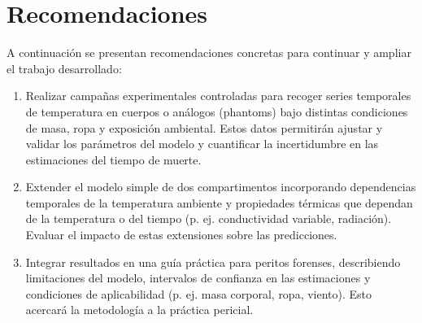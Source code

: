\documentclass[a4paper,10pt]{article}
\begin{document}
\section{Recomendaciones}\label{sec:rec}

	A continuación se presentan recomendaciones concretas para continuar y ampliar
	el trabajo desarrollado:

	\begin{enumerate}
		\item Realizar campañas experimentales controladas para recoger series temporales
		de temperatura en cuerpos o análogos (phantoms) bajo distintas condiciones de
		masa, ropa y exposición ambiental. Estos datos permitirán ajustar y validar los
		parámetros del modelo y cuantificar la incertidumbre en las estimaciones del
		tiempo de muerte.

		\item Extender el modelo simple de dos compartimentos incorporando dependencias
		temporales de la temperatura ambiente y propiedades térmicas que dependan de la
		temperatura o del tiempo (p. ej. conductividad variable, radiación). Evaluar
		el impacto de estas extensiones sobre las predicciones.

		\item Integrar resultados en una guía práctica para peritos forenses, describiendo
		limitaciones del modelo, intervalos de confianza en las estimaciones y condiciones
		de aplicabilidad (p. ej. masa corporal, ropa, viento). Esto acercará la metodología
		a la práctica pericial.
	\end{enumerate}

\end{document}
